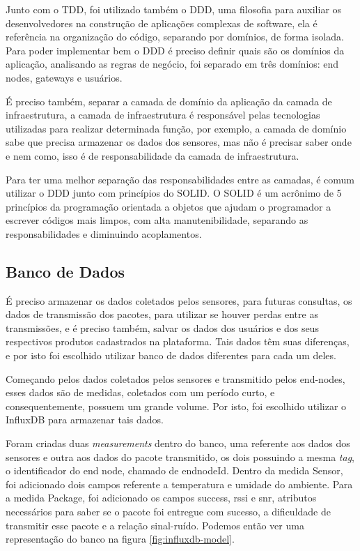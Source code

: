 Junto com o TDD, foi utilizado também o DDD, uma filosofia para auxiliar os desenvolvedores na construção de aplicações complexas de software, ela é referência na organização do código, separando por domínios, de forma isolada. Para poder implementar bem o DDD é preciso definir quais são os domínios da aplicação, analisando as regras de negócio, foi separado em três domínios: end nodes, gateways e usuários.

É preciso também, separar a camada de domínio da aplicação da camada de infraestrutura, a camada de infraestrutura é responsável pelas tecnologias utilizadas para realizar determinada função, por exemplo, a camada de domínio sabe que precisa armazenar os dados dos sensores, mas não é precisar saber onde e nem como, isso é de responsabilidade da camada de infraestrutura.

Para ter uma melhor separação das responsabilidades entre as camadas, é comum utilizar o DDD junto com princípios do SOLID. O SOLID é um acrônimo de 5 princípios da programação orientada a objetos que ajudam o programador a escrever códigos mais limpos, com alta manutenibilidade, separando as responsabilidades e diminuindo acoplamentos.

\subsection{Banco de Dados}
\label{metod:servidor:db}
É preciso armazenar os dados coletados pelos sensores, para futuras consultas, os dados de transmissão dos pacotes, para utilizar se houver perdas entre as transmissões, e é preciso também, salvar os dados dos usuários e dos seus respectivos produtos cadastrados na plataforma. Tais dados têm suas diferenças, e por isto foi escolhido utilizar banco de dados diferentes para cada um deles.
	
Começando pelos dados coletados pelos sensores e transmitido pelos end-nodes, esses dados são de medidas, coletados com um período curto, e consequentemente, possuem um grande volume. Por isto, foi escolhido utilizar o InfluxDB para armazenar tais dados.

Foram criadas duas \textit{measurements} dentro do banco, uma referente aos dados dos sensores e outra aos dados do pacote transmitido, os dois possuindo a mesma  \textit{tag}, o identificador do end node, chamado de endnodeId. Dentro da medida Sensor, foi adicionado dois campos referente a temperatura e umidade do ambiente. Para a medida Package, foi adicionado os campos success, rssi e snr, atributos necessários para saber se o pacote foi entregue com sucesso, a dificuldade de transmitir esse pacote e a relação sinal-ruído. Podemos então ver uma representação do banco na figura \ref{fig:influxdb-model}.

